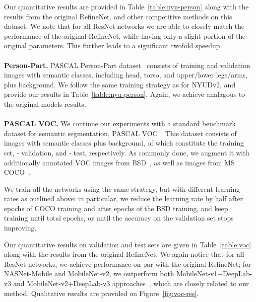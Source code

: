 \documentclass{bmvc2k}
\begin{document}
Our quantitative results are provided in Table~\ref{table:nyu-person} along with the results from the original RefineNet, and other competitive methods on this dataset. We note that for all ResNet networks we are able to closely match the performance of the original RefineNet, while having only a slight portion of the original parameters. This further leads to a significant twofold speedup.\\
\\
\textbf{Person-Part.} PASCAL Person-Part dataset~\cite{ChenMLFUY14,ChenYWXY16} consists of  training and  validation images with  semantic classes, including head, torso, and upper/lower legs/arms, plus background. We follow the same training strategy as for NYUDv2, and provide our results in Table~\ref{table:nyu-person}. Again, we achieve analagous to the original models results.\\
\\
\textbf{PASCAL VOC.} We continue our experiments with a standard benchmark dataset for semantic segmentation, PASCAL VOC~\cite{EveringhamGWWZ10}. This dataset consists of  images with  semantic classes plus background, of which  constitute the training set,  - validation, and  - test, respectively. As commonly done, we augment it with additionally annotated VOC images from BSD~\cite{HariharanABMM11}, as well as images from MS COCO~\cite{LinMBHPRDZ14}.
	
We train all the networks using the same strategy, but with different learning rates as outlined above: in particular, we reduce the learning rate by half after  epochs of COCO training and after  epochs of the BSD training, and keep training until  total epochs, or until the accuracy on the validation set stops improving.

Our quantitative results on validation and test sets are given in Table~\ref{table:voc} along with the results from the original RefineNet. We again notice that for all ResNet networks, we achieve performance on-par with the original RefineNet; for NASNet-Mobile and MobileNet-v2, we outperform both MobileNet-v1+DeepLab-v3 and MobileNet-v2+DeepLab-v3 approaches~\cite{abs-1801-04381}, which are closely related to our method. Qualitative results are provided on Figure~\ref{fig:voc-res}.
\end{document}
